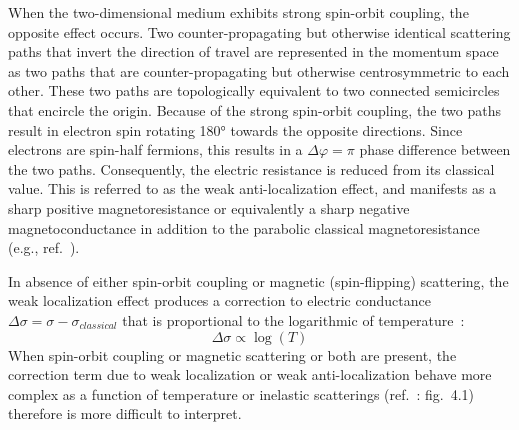 When the two-dimensional medium exhibits strong spin-orbit coupling, the opposite effect occurs. Two counter-propagating but otherwise identical scattering paths that invert the direction of travel are represented in the momentum space as two paths that are counter-propagating but otherwise centrosymmetric to each other. These two paths are topologically equivalent to two connected semicircles that encircle the origin. Because of the strong spin-orbit coupling, the two paths result in electron spin rotating \ang{180} towards the opposite directions. Since electrons are spin-half fermions, this results in a $\Delta\varphi=\pi$ phase difference between the two paths. Consequently, the electric resistance is reduced from its classical value. This is referred to as the weak anti-localization effect, and manifests as a sharp positive magnetoresistance or equivalently a sharp negative magnetoconductance in addition to the parabolic classical magnetoresistance (e.g., ref.~\cite{TI_WAL_Hongkong}).

In absence of either spin-orbit coupling or magnetic (spin-flipping) scattering, the weak localization effect produces a correction to electric conductance $\Delta\sigma = \sigma - \sigma_{classical}$ that is proportional to the logarithmic of temperature~\cite{anderson1979, dolan1979}:%
\begin{equation}\label{eq:wl_T}
    \Delta\sigma \propto \log(T)
\end{equation}%
When spin-orbit coupling or magnetic scattering or both are present, the correction term due to weak localization or weak anti-localization behave more complex as a function of temperature or inelastic scatterings (ref.~\cite{bergmann1984}: fig.~4.1) therefore is more difficult to interpret.

